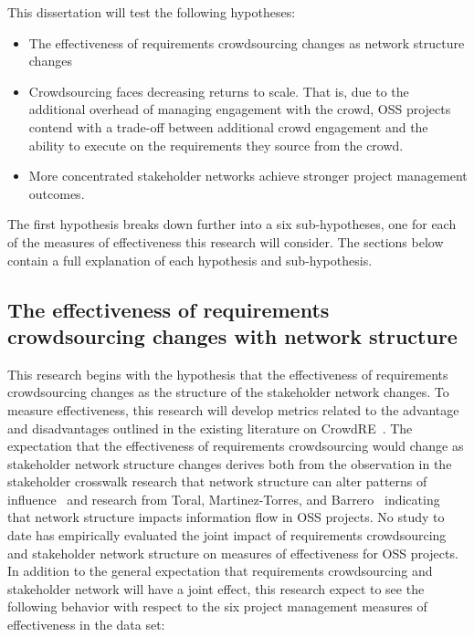 This dissertation will test the following hypotheses:

\begin{itemize}
    \item The effectiveness of requirements crowdsourcing changes as network structure changes
    \item Crowdsourcing faces decreasing returns to scale. That is, due to the additional overhead of managing engagement with the crowd, OSS projects contend with a trade-off between additional crowd engagement and the ability to execute on the requirements they source from the crowd.
    \item More concentrated stakeholder networks achieve stronger project management outcomes.
\end{itemize}

The first hypothesis breaks down further into a six sub-hypotheses, one for each of the measures of effectiveness this research will consider. The sections below contain a full explanation of each hypothesis and sub-hypothesis.

\subsection{The effectiveness of requirements crowdsourcing changes with network structure}

This research begins with the hypothesis that the effectiveness of requirements crowdsourcing changes as the structure of the stakeholder network changes. To measure effectiveness, this research will develop metrics related to the advantage and disadvantages outlined in the existing literature on CrowdRE~\cite{groen}. The expectation that the effectiveness of requirements crowdsourcing would change as stakeholder network structure changes derives both from the observation in the stakeholder crosswalk research that network structure can alter patterns of influence~\cite{wood} and research from Toral, Martinez-Torres, and Barrero~\cite{toral} indicating that network structure impacts information flow in OSS projects. No study to date has empirically evaluated the joint impact of requirements crowdsourcing and stakeholder network structure on measures of effectiveness for OSS projects. In addition to the general expectation that requirements crowdsourcing and stakeholder network will have a joint effect, this research expect to see the following behavior with respect to the six project management measures of effectiveness in the data set:

